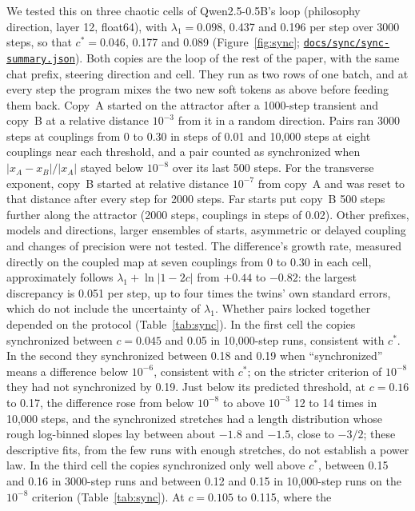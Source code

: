 \documentclass[11pt,letterpaper]{article}
\newcommand{\repourl}{https://github.com/tdj28/neural-shrimp}
\newcommand{\reporef}{arxiv-v1}
\newcommand{\repo}[1]{\href{\repourl/blob/\reporef/#1}{\nolinkurl{#1}}}
\begin{document}
We tested this on three chaotic cells of Qwen2.5-0.5B's loop (philosophy direction, layer 12, float64), with
$\lambda_1=0.098$, 0.437 and 0.196 per step over 3000 steps, so that $c^*=0.046$, 0.177 and 0.089
(Figure~\ref{fig:sync}; \repo{docs/sync/sync-summary.json}). Both copies are the loop of the rest of the paper,
with the same chat prefix, steering direction and cell. They run as two rows of one batch, and at every step the
program mixes the two new soft tokens as above before feeding them back. Copy~A started on the attractor after a
1000-step transient and copy~B at a relative distance $10^{-3}$ from it in a random direction. Pairs ran 3000 steps at
couplings from 0 to 0.30 in steps of 0.01 and 10,000 steps at eight couplings near each threshold, and a pair counted as
synchronized when $|x_A-x_B|/|x_A|$ stayed below $10^{-8}$ over its last 500 steps. For the transverse exponent, copy~B started at relative distance $10^{-7}$ from copy~A and was reset to that distance
after every step for 2000 steps. Far starts put copy~B 500 steps further along the attractor (2000 steps, couplings in
steps of 0.02). Other prefixes, models and directions, larger ensembles of starts, asymmetric or delayed coupling and
changes of precision were not tested. The difference's growth rate, measured directly on the coupled map at seven
couplings from 0 to 0.30 in each cell, approximately follows $\lambda_1+\ln|1-2c|$ from $+0.44$ to $-0.82$: the
largest discrepancy is 0.051 per step, up to four times the twins' own standard errors, which do not include the
uncertainty of $\lambda_1$. Whether pairs locked together depended on the protocol (Table~\ref{tab:sync}). In the first
cell the copies synchronized between $c=0.045$ and 0.05 in 10,000-step runs, consistent with $c^*$. In the second they
synchronized between 0.18 and 0.19 when ``synchronized'' means a difference below $10^{-6}$, consistent with $c^*$; on
the stricter criterion of $10^{-8}$ they had not synchronized by 0.19. Just below its predicted threshold, at $c=0.16$
to 0.17, the difference rose from below $10^{-8}$ to above $10^{-3}$ 12 to 14 times in 10,000 steps, and the synchronized stretches had a
length distribution whose rough log-binned slopes lay between about $-1.8$ and $-1.5$, close to $-3/2$; these
descriptive fits, from the few runs with enough stretches, do not establish a power law.
In the third cell the copies synchronized only well above $c^*$, between 0.15 and 0.16 in 3000-step runs and between
0.12 and 0.15 in 10,000-step runs on the $10^{-8}$ criterion (Table~\ref{tab:sync}). At $c=0.105$ to 0.115, where the
\end{document}
